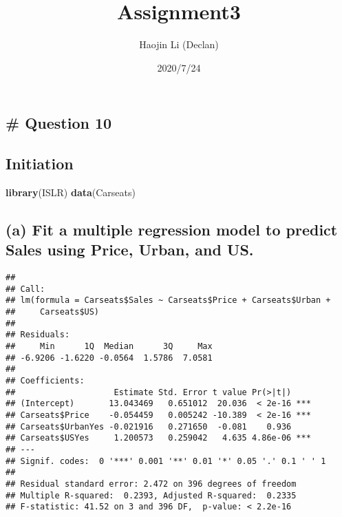 \documentclass[
]{article}
\title{Assignment3}
\author{Haojin Li (Declan)}
\date{2020/7/24}
\newenvironment{Shaded}{\begin{snugshade}}{\end{snugshade}}
\newcommand{\KeywordTok}[1]{\textcolor[rgb]{0.13,0.29,0.53}{\textbf{#1}}}
\newcommand{\NormalTok}[1]{#1}
\newcommand{\OperatorTok}[1]{\textcolor[rgb]{0.81,0.36,0.00}{\textbf{#1}}}
\newcommand{\StringTok}[1]{\textcolor[rgb]{0.31,0.60,0.02}{#1}}
\begin{document}
\maketitle

{
\setcounter{tocdepth}{2}
\tableofcontents
}
\hypertarget{question-10}{%
\subsection{\# Question 10}\label{question-10}}

\hypertarget{initiation}{%
\subsection{Initiation}\label{initiation}}

\begin{Shaded}
\begin{Highlighting}[]
\KeywordTok{library}\NormalTok{(ISLR)}
\KeywordTok{data}\NormalTok{(Carseats)}
\end{Highlighting}
\end{Shaded}

\hypertarget{a-fit-a-multiple-regression-model-to-predict-sales-using-price-urban-and-us.}{%
\subsection{(a) Fit a multiple regression model to predict Sales using
Price, Urban, and
US.}\label{a-fit-a-multiple-regression-model-to-predict-sales-using-price-urban-and-us.}}

\begin{Shaded}
\end{Shaded}

\begin{verbatim}
## 
## Call:
## lm(formula = Carseats$Sales ~ Carseats$Price + Carseats$Urban + 
##     Carseats$US)
## 
## Residuals:
##     Min      1Q  Median      3Q     Max 
## -6.9206 -1.6220 -0.0564  1.5786  7.0581 
## 
## Coefficients:
##                    Estimate Std. Error t value Pr(>|t|)    
## (Intercept)       13.043469   0.651012  20.036  < 2e-16 ***
## Carseats$Price    -0.054459   0.005242 -10.389  < 2e-16 ***
## Carseats$UrbanYes -0.021916   0.271650  -0.081    0.936    
## Carseats$USYes     1.200573   0.259042   4.635 4.86e-06 ***
## ---
## Signif. codes:  0 '***' 0.001 '**' 0.01 '*' 0.05 '.' 0.1 ' ' 1
## 
## Residual standard error: 2.472 on 396 degrees of freedom
## Multiple R-squared:  0.2393, Adjusted R-squared:  0.2335 
## F-statistic: 41.52 on 3 and 396 DF,  p-value: < 2.2e-16
\end{verbatim}
\end{document}
